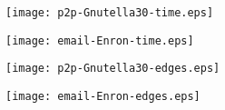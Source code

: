 \begin{figure*}
\begin{minipage}[b]{0.5\linewidth}
\flushleft
\texttt{[image: p2p-Gnutella30-time.eps]}
\caption{\XXX} \label{fig:gnutella:time}
\end{minipage}%
\begin{minipage}[b]{0.5\linewidth}
\centering
\texttt{[image: email-Enron-time.eps]}
\caption{\XXX} \label{fig:email:time}
\end{minipage}
\end{figure*}
\begin{figure*}
\begin{minipage}[b]{0.5\linewidth}
\flushleft
\texttt{[image: p2p-Gnutella30-edges.eps]}
\caption{\XXX} \label{fig:gnutella:edges}
\end{minipage}%
\begin{minipage}[b]{0.5\linewidth}
\centering
\texttt{[image: email-Enron-edges.eps]}
\caption{\XXX} \label{fig:email:edges}
\end{minipage}
\end{figure*}

